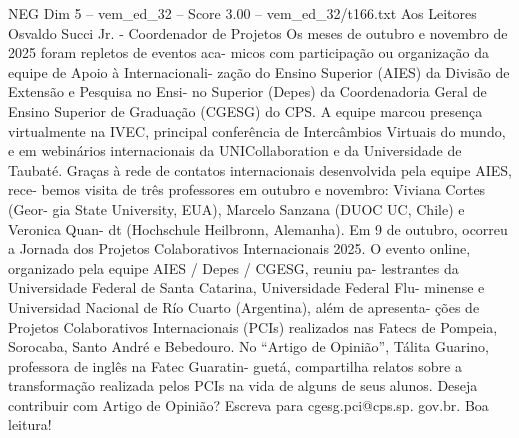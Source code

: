 \begin{textsample}{NEG Dim 5 – vem\_ed\_32 – Score 3.00 – vem\_ed\_32/t166.txt}  \label{ex:f5_neg_145}
Aos Leitores Osvaldo Succi Jr. - Coordenador de Projetos Os meses de outubro e novembro de 2025 foram repletos de eventos aca- micos com participação ou organização da equipe de Apoio à Internacionali- zação do Ensino Superior (AIES) da Divisão de Extensão e Pesquisa no Ensi- no Superior (Depes) da Coordenadoria Geral de Ensino Superior de Graduação (CGESG) do CPS.
A equipe marcou presença virtualmente na IVEC, principal conferência de Intercâmbios Virtuais do mundo, e em webinários internacionais da UNICollaboration e da Universidade de Taubaté.
Graças à rede de contatos internacionais desenvolvida pela equipe AIES, rece- bemos visita de três professores em outubro e novembro: Viviana Cortes (Geor- gia State University, EUA), Marcelo Sanzana (DUOC UC, Chile) e Veronica Quan- dt (Hochschule Heilbronn, Alemanha).
Em 9 de outubro, ocorreu a Jornada dos Projetos Colaborativos Internacionais 2025.
O evento online, organizado pela equipe AIES / Depes / CGESG, reuniu pa- lestrantes da Universidade Federal de Santa Catarina, Universidade Federal Flu- minense e Universidad Nacional de Río Cuarto (Argentina), além de apresenta- ções de Projetos Colaborativos Internacionais (PCIs) realizados nas Fatecs de Pompeia, Sorocaba, Santo André e Bebedouro.
No “Artigo de Opinião”, Tálita Guarino, professora de inglês na Fatec Guaratin- guetá, compartilha relatos sobre a transformação realizada pelos PCIs na vida de alguns de seus alunos.
Deseja contribuir com Artigo de Opinião?
Escreva para cgesg.pci@cps.sp. gov.br.
Boa leitura!

\end{textsample}
